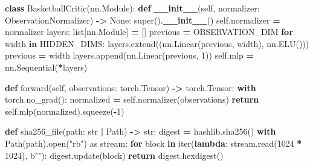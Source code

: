 \documentclass[
  chinese,
  11pt,
  letterpaper,
]{article}
\newenvironment{Shaded}{\begin{snugshade}}{\end{snugshade}}
\newcommand{\BuiltInTok}[1]{#1}
\newcommand{\ControlFlowTok}[1]{\textcolor[rgb]{0.13,0.29,0.53}{\textbf{#1}}}
\newcommand{\DecValTok}[1]{\textcolor[rgb]{0.00,0.00,0.81}{#1}}
\newcommand{\FunctionTok}[1]{\textcolor[rgb]{0.13,0.29,0.53}{\textbf{#1}}}
\newcommand{\ImportTok}[1]{#1}
\newcommand{\KeywordTok}[1]{\textcolor[rgb]{0.13,0.29,0.53}{\textbf{#1}}}
\newcommand{\NormalTok}[1]{#1}
\newcommand{\OperatorTok}[1]{\textcolor[rgb]{0.81,0.36,0.00}{\textbf{#1}}}
\newcommand{\StringTok}[1]{\textcolor[rgb]{0.31,0.60,0.02}{#1}}
\newcommand{\VariableTok}[1]{\textcolor[rgb]{0.00,0.00,0.00}{#1}}
\renewenvironment{Shaded}{\par\smallskip}{\par\smallskip}
\begin{document}
\begin{Shaded}
\begin{Highlighting}[]
\KeywordTok{class}\NormalTok{ BasketballCritic(nn.Module):}
    \KeywordTok{def} \FunctionTok{\_\_init\_\_}\NormalTok{(}\VariableTok{self}\NormalTok{, normalizer: ObservationNormalizer) }\OperatorTok{{-}\textgreater{}} \VariableTok{None}\NormalTok{:}
        \BuiltInTok{super}\NormalTok{().}\FunctionTok{\_\_init\_\_}\NormalTok{()}
        \VariableTok{self}\NormalTok{.normalizer }\OperatorTok{=}\NormalTok{ normalizer}
\NormalTok{        layers: }\BuiltInTok{list}\NormalTok{[nn.Module] }\OperatorTok{=}\NormalTok{ []}
\NormalTok{        previous }\OperatorTok{=}\NormalTok{ OBSERVATION\_DIM}
        \ControlFlowTok{for}\NormalTok{ width }\KeywordTok{in}\NormalTok{ HIDDEN\_DIMS:}
\NormalTok{            layers.extend((nn.Linear(previous, width), nn.ELU()))}
\NormalTok{            previous }\OperatorTok{=}\NormalTok{ width}
\NormalTok{        layers.append(nn.Linear(previous, }\DecValTok{1}\NormalTok{))}
        \VariableTok{self}\NormalTok{.mlp }\OperatorTok{=}\NormalTok{ nn.Sequential(}\OperatorTok{*}\NormalTok{layers)}

    \KeywordTok{def}\NormalTok{ forward(}\VariableTok{self}\NormalTok{, observations: torch.Tensor) }\OperatorTok{{-}\textgreater{}}\NormalTok{ torch.Tensor:}
        \ControlFlowTok{with}\NormalTok{ torch.no\_grad():}
\NormalTok{            normalized }\OperatorTok{=} \VariableTok{self}\NormalTok{.normalizer(observations)}
        \ControlFlowTok{return} \VariableTok{self}\NormalTok{.mlp(normalized).squeeze(}\OperatorTok{{-}}\DecValTok{1}\NormalTok{)}


\KeywordTok{def}\NormalTok{ sha256\_file(path: }\BuiltInTok{str} \OperatorTok{|}\NormalTok{ Path) }\OperatorTok{{-}\textgreater{}} \BuiltInTok{str}\NormalTok{:}
\NormalTok{    digest }\OperatorTok{=}\NormalTok{ hashlib.sha256()}
    \ControlFlowTok{with}\NormalTok{ Path(path).}\BuiltInTok{open}\NormalTok{(}\StringTok{"rb"}\NormalTok{) }\ImportTok{as}\NormalTok{ stream:}
        \ControlFlowTok{for}\NormalTok{ block }\KeywordTok{in} \BuiltInTok{iter}\NormalTok{(}\KeywordTok{lambda}\NormalTok{: stream.read(}\DecValTok{1024} \OperatorTok{*} \DecValTok{1024}\NormalTok{), }\StringTok{b""}\NormalTok{):}
\NormalTok{            digest.update(block)}
    \ControlFlowTok{return}\NormalTok{ digest.hexdigest()}



\end{Highlighting}
\end{Shaded}
\end{document}
